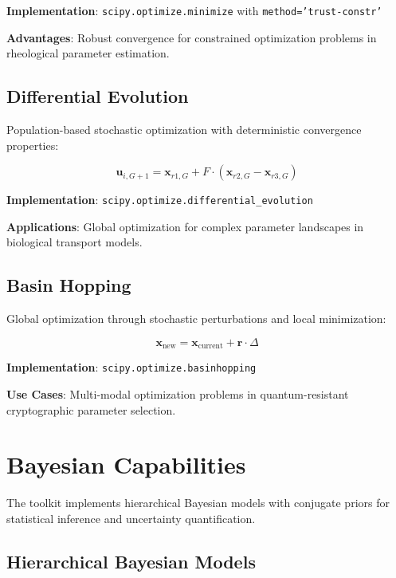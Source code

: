 \documentclass[11pt,a4paper]{article}
\begin{document}
\textbf{Implementation}: \texttt{scipy.optimize.minimize} with \texttt{method='trust-constr'}

\textbf{Advantages}: Robust convergence for constrained optimization problems in rheological parameter estimation.

\subsection{Differential Evolution}
\label{subsec:de}

Population-based stochastic optimization with deterministic convergence properties:

\begin{equation}
\mathbf{u}_{i,G+1} = \mathbf{x}_{r1,G} + F \cdot (\mathbf{x}_{r2,G} - \mathbf{x}_{r3,G})
\label{eq:de_mutation}
\end{equation}

\textbf{Implementation}: \texttt{scipy.optimize.differential\_evolution}

\textbf{Applications}: Global optimization for complex parameter landscapes in biological transport models.

\subsection{Basin Hopping}
\label{subsec:basinhopping}

Global optimization through stochastic perturbations and local minimization:

\begin{equation}
\mathbf{x}_{\text{new}} = \mathbf{x}_{\text{current}} + \mathbf{r} \cdot \Delta
\label{eq:basinhopping_perturbation}
\end{equation}

\textbf{Implementation}: \texttt{scipy.optimize.basinhopping}

\textbf{Use Cases}: Multi-modal optimization problems in quantum-resistant cryptographic parameter selection.

\section{Bayesian Capabilities}
\label{sec:bayesian}

The toolkit implements hierarchical Bayesian models with conjugate priors for statistical inference and uncertainty quantification.

\subsection{Hierarchical Bayesian Models}
\label{subsec:hb_models}
\end{document}
